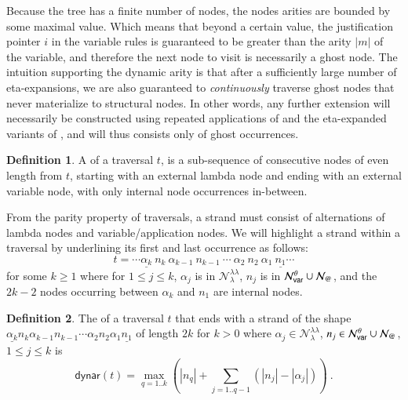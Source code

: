 \documentclass{elsarticle}
\makeatletter
\theoremstyle{plain}
\theoremstyle{definition}
\newtheorem{definition}{Definition}[section]
\newcommand\Nodes{\mathcal{N}}%
\newcommand\NodesVar{\Nodes_{\sf var}}%
\newcommand\NodesLmd{\Nodes_\lambda}%
\newcommand\NodesApp{\Nodes_@}%
\newcommand{\ghostlmd}{{\lambda\!\!\lambda}}
\newcommand{\ghostvar}{\theta}
\newcommand\ExtendedNodesVar{\NodesVar^\ghostvar}
\newcommand\ExtendedNodesLmd{\NodesLmd^\ghostlmd}
\newcommand\dynar{\textsf{dynar}} %
\makeatother
\begin{document}
Because the tree has a finite number of nodes, the nodes arities are bounded by some maximal value. Which means that beyond a certain value, the
justification pointer $i$ in the variable rules  is guaranteed to be greater than the arity $|m|$ of the variable, and therefore the next node to visit is necessarily a ghost node. The intuition supporting the dynamic arity is that after a sufficiently large number of eta-expansions, we are also guaranteed to \emph{continuously} traverse ghost nodes that never materialize to structural nodes. In other words, any further extension will necessarily be constructed using repeated applications of \rulenamet{Lam^\ghostvar} and the eta-expanded variants of , and will thus consists only of ghost occurrences.


\begin{definition}
\label{ref:strand}
A  of a traversal $t$, is a sub-sequence of consecutive nodes of even length from $t$, starting with an external lambda node and ending with an external variable node, with only internal node occurrences in-between.
\end{definition}

From the parity property of traversals, a strand must consist of alternations of lambda nodes and variable/application nodes. We will highlight a strand within a traversal by underlining its first and last occurrence as follows:
$$ t = \cdots \underline{\alpha_k}\ n_k\ \alpha_{k-1}\ n_{k-1}\ \cdots\ \alpha_2\ n_2\ \alpha_1\ \underline{n_1} \cdots $$
for some $k\geq 1$ where for $1 \leq j \leq k$, $\alpha_j$ is in $\ExtendedNodesLmd$, $n_j$ is in $\ExtendedNodesVar\union\NodesApp$, and the $2k-2$ nodes occurring between $\alpha_k$ and $n_1$ are internal nodes.

\begin{definition} %
\label{dfn:dynamic-arity}
The  of a traversal $t$ that ends with a strand
 of the shape $\underline{\alpha_k} n_k \alpha_{k-1} n_{k-1}\cdots \alpha_2 n_2 \alpha_1 \underline{n_1}$ of length $2k$ for $k>0$ where $\alpha_j \in \ExtendedNodesLmd$, $n_j \in \ExtendedNodesVar\union\NodesApp$, $1\leq j\leq k$ is
$$
\dynar(t)
  = \max_{q=1..k} \left( |n_q| + \sum_{j=1..q-1} (|n_j|-|\alpha_j|) \right) \ .
$$
\end{definition}
\end{document}
